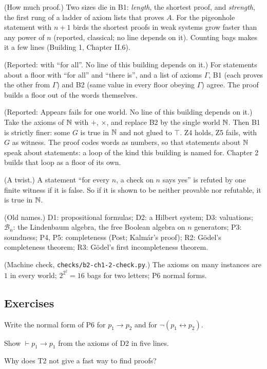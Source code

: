 \begin{lines}
\item[\lab{R1}] (How much proof.) Two sizes die in B1: \emph{length}, the shortest proof, and \emph{strength}, the first rung of a ladder of axiom lists that proves $A$. For the pigeonhole statement with $n + 1$ birds the shortest proofs in weak systems grow faster than any power of $n$ (reported, classical; no line depends on it). Counting bags makes it a few lines (Building 1, Chapter II.6).
\item[\lab{R2}] (Reported: with ``for all''. No line of this building depends on it.) For statements about a floor with ``for all'' and ``there is'', and a list of axioms $\Gamma$, B1 (each proves the other from $\Gamma$) and B2 (same value in every floor obeying $\Gamma$) agree. The proof builds a floor out of the words themselves.
\item[\lab{R3}] (Reported: Appears fails for one world. No line of this building depends on it.) Take the axioms of $\mathbb{N}$ with $+$, $\times$, and replace B2 by the single world $\mathbb{N}$. Then B1 is strictly finer: some $G$ is true in $\mathbb{N}$ and not glued to $\top$. Z4 holds, Z5 fails, with $G$ as witness. The proof codes words as numbers, so that statements about $\mathbb{N}$ speak about statements: a loop of the kind this building is named for. Chapter 2 builds that loop as a floor of its own.
\item[\lab{R4}] (A twist.) A statement ``for every $n$, a check on $n$ says yes'' is refuted by one finite witness if it is false. So if it is shown to be neither provable nor refutable, it is true in $\mathbb{N}$.
\item[\lab{R5}] (Old names.) D1: propositional formulas; D2: a Hilbert system; D3: valuations; $\mathcal{B}_n$: the Lindenbaum algebra, the free Boolean algebra on $n$ generators; P3: soundness; P4, P5: completeness (Post; Kalm\'ar's proof); R2: G\"odel's completeness theorem; R3: G\"odel's first incompleteness theorem.
\item[\lab{R6}] (Machine check, \texttt{checks/b2-ch1-2-check.py}.) The axioms on many instances are $1$ in every world; $2^{2^2} = 16$ bags for two letters; P6 normal forms.
\end{lines}

\subsection*{Exercises}

\begin{lines}
\item[\lab{E1}] Write the normal form of P6 for $p_1 \to p_2$ and for $\neg(p_1 \leftrightarrow p_2)$.
\item[\lab{E2}] Show $\vdash p_1 \to p_1$ from the axioms of D2 in five lines.
\item[\lab{E3}] Why does T2 not give a fast way to find proofs?
\end{lines}


